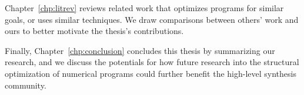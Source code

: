 Chapter~\ref{chp:litrev} reviews related work that optimizes programs for
similar goals, or uses similar techniques.  We draw comparisons between others'
work and ours to better motivate the thesis's contributions.

Finally, Chapter~\ref{chp:conclusion} concludes this thesis by summarizing
our research, and we discuss the potentials for how future research into
the structural optimization of numerical programs could further benefit the
high-level synthesis community.
